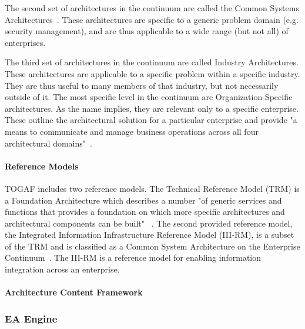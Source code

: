 The second set of architectures in the continuum are called the Common Systems Architectures~\cite[Ch. 39.4.1]{togaf9.1}. These architectures are specific to a generic problem domain (e.g. security management), and are thus applicable to a wide range (but not all) of enterprises.

The third set of architectures in the continuum are called Industry Architectures. These architectures are applicable to a specific problem within a specific industry. They are thus useful to many members of that industry, but not necessarily outside of it. The most specific level in the continuum are Organization-Specific  architectures. As the name implies, they are relevant only to a specific enterprise. These outline the architectural solution for a particular enterprise and provide "a means to communicate and manage business operations across all four architectural domains"~\cite[Ch. 39.4.1]{togaf9.1}.

\paragraph*{Reference Models}
TOGAF includes two reference models. The Technical Reference Model (TRM) is a Foundation Architecture which describes a number "of generic services and functions that provides a foundation on which more specific architectures and architectural components can be built" ~\cite[Sec. 43.1.1]{togaf9.1}. The second provided reference model, the Integrated Information Infrastructure Reference Model (III-RM), is a subset of the TRM and is classified as a Common System Architecture on the Enterprise Continuum~\cite[Ch. 44]{togaf9.1}. The III-RM is a reference model for enabling information integration across an enterprise. 



\paragraph*{Architecture Content Framework}

\subsubsection{EA Engine}

